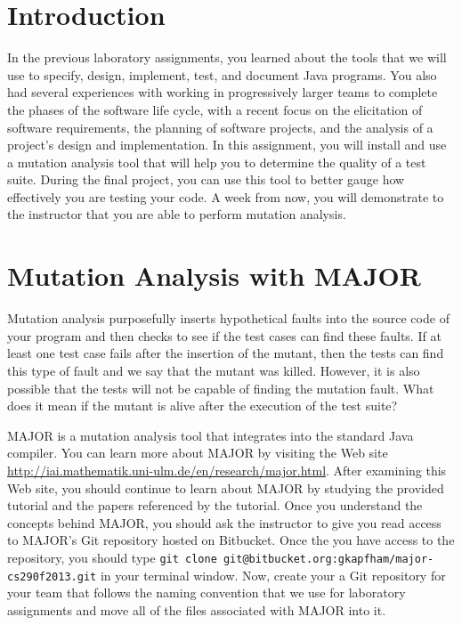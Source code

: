 

\usepackage[compact]{titlesec}



\section*{Introduction}

In the previous laboratory assignments, you learned about the tools that we will use to specify, design, implement,
test, and document Java programs.  You also had several experiences with working in progressively larger teams to
complete the phases of the software life cycle, with a recent focus on the elicitation of software requirements, the
planning of software projects, and the analysis of a project's design and implementation.  In this assignment, you will
install and use a mutation analysis tool that will help you to determine the quality of a test suite.  During the final
project, you can use this tool to better gauge how effectively you are testing your code. A week from now, you will
demonstrate to the instructor that you are able to perform mutation analysis.

\section*{Mutation Analysis with MAJOR}

Mutation analysis purposefully inserts hypothetical faults into the source code of your program and then checks to see
if the test cases can find these faults.  If at least one test case fails after the insertion of the mutant, then
the tests can find this type of fault and we say that the mutant was killed.  However, it is also possible that the
tests will not be capable of finding the mutation fault. What does it mean if the mutant is alive after the execution of
the test suite?

MAJOR is a mutation analysis tool that integrates into the standard Java compiler. You can learn more about MAJOR by
visiting the Web site \url{http://iai.mathematik.uni-ulm.de/en/research/major.html}.  After examining this Web site, you
should continue to learn about MAJOR by studying the provided tutorial and the papers referenced by the tutorial.  Once
you understand the concepts behind MAJOR, you should ask the instructor to give you read access to MAJOR's Git repository
hosted on Bitbucket. Once the you have access to the repository, you should type {\tt git clone
git@bitbucket.org:gkapfham/major-cs290f2013.git} in your terminal window.  Now, create your a Git repository for your
team that follows the naming convention that we use for laboratory assignments and move all of the files associated with
MAJOR into it. 

